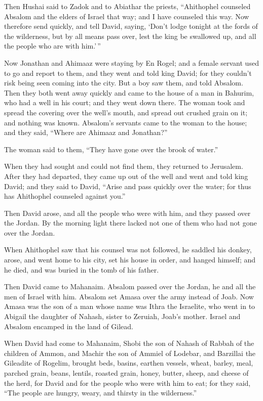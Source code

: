  Then Hushai said to Zadok and to Abiathar the priests,
``Ahithophel counseled Absalom and the elders of Israel that way; and I
have counseled this way.  Now therefore send quickly, and
tell David, saying, `Don't lodge tonight at the fords of the wilderness,
but by all means pass over, lest the king be swallowed up, and all the
people who are with him.'\,''

 Now Jonathan and Ahimaaz were staying by En Rogel; and a
female servant used to go and report to them, and they went and told
king David; for they couldn't risk being seen coming into the city.
 But a boy saw them, and told Absalom. Then they both
went away quickly and came to the house of a man in Bahurim, who had a
well in his court; and they went down there.  The woman
took and spread the covering over the well's mouth, and spread out
crushed grain on it; and nothing was known.  Absalom's
servants came to the woman to the house; and they said, ``Where are
Ahimaaz and Jonathan?''

The woman said to them, ``They have gone over the brook of water.''

When they had sought and could not find them, they returned to
Jerusalem.  After they had departed, they came up out of
the well and went and told king David; and they said to David, ``Arise
and pass quickly over the water; for thus has Ahithophel counseled
against you.''

 Then David arose, and all the people who were with him,
and they passed over the Jordan. By the morning light there lacked not
one of them who had not gone over the Jordan.

 When Ahithophel saw that his counsel was not followed,
he saddled his donkey, arose, and went home to his city, set his house
in order, and hanged himself; and he died, and was buried in the tomb of
his father.

 Then David came to Mahanaim. Absalom passed over the
Jordan, he and all the men of Israel with him.  Absalom
set Amasa over the army instead of Joab. Now Amasa was the son of a man
whose name was Ithra the Israelite, who went in to Abigail the daughter
of Nahash, sister to Zeruiah, Joab's mother.  Israel and
Absalom encamped in the land of Gilead.

 When David had come to Mahanaim, Shobi the son of Nahash
of Rabbah of the children of Ammon, and Machir the son of Ammiel of
Lodebar, and Barzillai the Gileadite of Rogelim,  brought
beds, basins, earthen vessels, wheat, barley, meal, parched grain,
beans, lentils, roasted grain,  honey, butter, sheep, and
cheese of the herd, for David and for the people who were with him to
eat; for they said, ``The people are hungry, weary, and thirsty in the
wilderness.''

